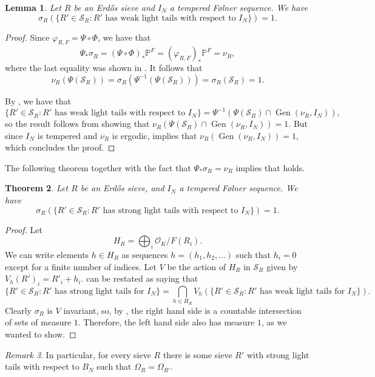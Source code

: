 \documentclass[a4paper,11pt,reqno]{amsart}
\theoremstyle{plain}
\newtheorem{theorem}{Theorem}[section]
\newtheorem{lemma}[theorem]{Lemma}
\theoremstyle{remark}
\newtheorem{remark}[theorem]{Remark}
\DeclareMathOperator{\Gen}{Gen}
\newcommand{\co}{\mathcal{O}}
\newcommand{\cs}{\mathcal{S}}
\newcommand{\vrf}{\varphi_{R,F}}
\newcommand{\mmp}{\mathbb{P}}
\begin{document}
			\begin{lemma}
				\label{lm: sieves with weak light tails have measure 1}
				Let $R$ be an Erdős sieve and $I_N$ a tempered Følner sequence. We have $$\sigma_R(\{R'\in\cs_R: R' \text{ has weak light tails with respect to } I_N\}) = 1.$$ 
			\end{lemma}
			
			\begin{proof}
				Since $\vrf = \Psi \circ \Phi$, we have that $$\Psi_*\sigma_R = (\Psi \circ\Phi)_* \mmp^F = (\vrf)_*\mmp^F = \nu_R,$$ where the last equality was shown in  . It follows that $$\nu_R(\Psi(\cs_R)) = \sigma_R(\Psi^{-1}(\Psi(\cs_R))) = \sigma_R(\cs_R) = 1.$$ 
				
				By  , we have that $$\{R'\in\cs_R: R' \text{ has weak light tails with respect to } I_N\} = \Psi^{-1}(\Psi(\cs_R) \cap \Gen(\nu_R,I_N)),$$ so the result follows from showing that $\nu_R(\Psi(\cs_R) \cap \Gen(\nu_R,I_N)) = 1.$ But since $I_N$ is tempered and $\nu_R$ is ergodic,    implies that $\nu_R(\Gen(\nu_R,I_N)) = 1$, which concludes the proof.
			\end{proof}
			
			The following theorem together with the fact that $\Psi_*\sigma_R = \nu_R$ implies that  holds.
			
			\begin{theorem}
				\label{thm: R is OmegaR=OmegaRp to some sieve with strong light tails}
				Let $R$ be an Erdős sieve, and $I_N$ a tempered Følner sequence. We have $$\sigma_R(\{R'\in\cs_R: R' \text{ has strong light tails with respect to } I_N\}) = 1.$$
			\end{theorem}
			
			\begin{proof}
				Let $$H_{R} = \bigoplus_i \co_K/F(R_i).$$ We can write elements $h \in H_R$ as sequences $h = (h_1,h_2,\dots)$ such that $h_i = 0$ except for a finite number of indices. Let $V$ be the action of $H_R$ in $\cs_R$ given by $V_h(R')_i = R'_i + h_i$.   can be restated as saying that $$\{R'\in\cs_R: R' \text{ has strong light tails for } I_N\} = \bigcap_{h \in H_R} V_h(\{R'\in\cs_R: R' \text{ has weak light tails for } I_N\}).$$ Clearly $\sigma_R$ is $V$ invariant, so, by  , the right hand side is a countable intersection of sets of measure $1$. Therefore, the left hand side also has measure $1$, as we wanted to show.
			\end{proof}
			\begin{remark}
				In particular, for every sieve $R$ there is some sieve $R'$ with strong light tails with respect to $B_N$ such that $\Omega_R = \Omega_{R'}$.
			\end{remark}
			
\end{document}
